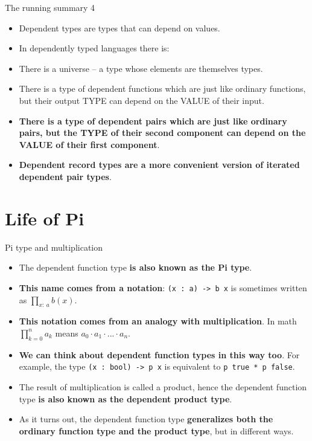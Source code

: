 \documentclass{beamer}
\newcommand{\m}[1]{\texttt{#1}}
\begin{document}
\begin{frame}{The running summary 4}
\begin{itemize}
	\item Dependent types are types that can depend on values.
	\item In dependently typed languages there is:
	\item There is a universe -- a type whose elements are themselves types.
	\item There is a type of dependent functions which are just like ordinary functions, but their output TYPE can depend on the VALUE of their input.
	\item \textbf{There is a type of dependent pairs which are just like ordinary pairs, but the TYPE of their second component can depend on the VALUE of their first component}.
	\item \textbf{Dependent record types are a more convenient version of iterated dependent pair types}.
\end{itemize}
\end{frame}

\section{Life of Pi}

\begin{frame}{Pi type and multiplication}
\begin{itemize}
	\item The dependent function type \textbf{is also known as the Pi type}.
	\item \textbf{This name comes from a notation}: \m{(x :\ a) -> b x} is sometimes written as $\displaystyle \prod_{x :\ a} b(x)$.
	\item \textbf{This notation comes from an analogy with multiplication}. In math $\displaystyle \prod_{k = 0}^n a_k$ means $a_0 \cdot a_1 \cdot ... \cdot a_n$.
	\item \textbf{We can think about dependent function types in this way too}. For example, the type \m{(x :\ bool) -> p x} is equivalent to \m{p true * p false}.
	\item The result of multiplication is called a product, hence the dependent function type \textbf{is also known as the dependent product type}.
	\item As it turns out, the dependent function type \textbf{generalizes both the ordinary function type and the product type}, but in different ways.
\end{itemize}
\end{frame}
\end{document}
